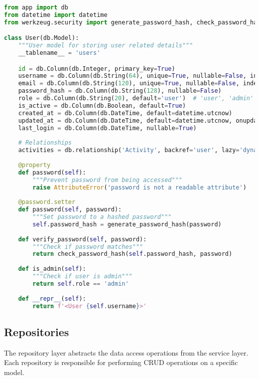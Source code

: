 \documentclass{article}
\begin{document}
\begin{lstlisting}[language=python, caption=User Model in app/models/user.py]
from app import db
from datetime import datetime
from werkzeug.security import generate_password_hash, check_password_hash

class User(db.Model):
    """User model for storing user related details"""
    __tablename__ = 'users'

    id = db.Column(db.Integer, primary_key=True)
    username = db.Column(db.String(64), unique=True, nullable=False, index=True)
    email = db.Column(db.String(120), unique=True, nullable=False, index=True)
    password_hash = db.Column(db.String(128), nullable=False)
    role = db.Column(db.String(20), default='user')  # 'user', 'admin'
    is_active = db.Column(db.Boolean, default=True)
    created_at = db.Column(db.DateTime, default=datetime.utcnow)
    updated_at = db.Column(db.DateTime, default=datetime.utcnow, onupdate=datetime.utcnow)
    last_login = db.Column(db.DateTime, nullable=True)
    
    # Relationships
    activities = db.relationship('Activity', backref='user', lazy='dynamic')
    
    @property
    def password(self):
        """Prevent password from being accessed"""
        raise AttributeError('password is not a readable attribute')
    
    @password.setter
    def password(self, password):
        """Set password to a hashed password"""
        self.password_hash = generate_password_hash(password)
    
    def verify_password(self, password):
        """Check if password matches"""
        return check_password_hash(self.password_hash, password)
    
    def is_admin(self):
        """Check if user is admin"""
        return self.role == 'admin'
    
    def __repr__(self):
        return f'<User {self.username}>'
\end{lstlisting}

\subsection{Repositories}

The repository layer abstracts the data access operations from the service layer. Each repository is responsible for performing CRUD operations on a specific model.
\end{document}
